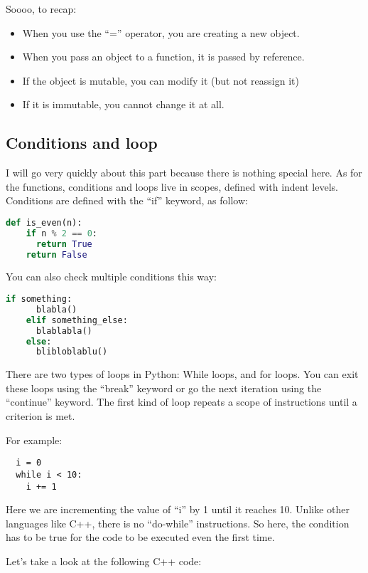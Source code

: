 \vspace{5mm}

Soooo, to recap:

\begin{itemize}
\item When you use the ``='' operator, you are creating a new object.
\item When you pass an object to a function, it is passed by reference.
\item If the object is mutable, you can modify it (but not reassign it)
\item If it is immutable, you cannot change it at all.
\end{itemize}

\subsection{Conditions and loop}
I will go very quickly about this part because there is nothing special here.
As for the functions, conditions and loops live in scopes, defined with indent levels.
Conditions are defined with the ``if'' keyword, as follow:

\begin{lstlisting}[language=python]
  def is_even(n):
    if n % 2 == 0:
      return True
    return False
\end{lstlisting}

You can also check multiple conditions this way:
\begin{lstlisting}[language=python]
    if something:
      blabla()
    elif something_else:
      blablabla()
    else:
      blibloblablu()
\end{lstlisting}


There are two types of loops in Python: While loops, and for loops. You can exit
these loops using the ``break'' keyword or go the next iteration using the ``continue''
keyword. The first kind of loop repeats a scope of instructions until a criterion is met.

For example:

\begin{lstlisting}
  i = 0
  while i < 10:
    i += 1
\end{lstlisting}

Here we are incrementing the value of ``i'' by 1 until it reaches 10. Unlike other
languages like C++, there is no ``do-while'' instructions. So here, the condition has
to be true for the code to be executed even the first time.

Let's take a look at the following C++ code:

